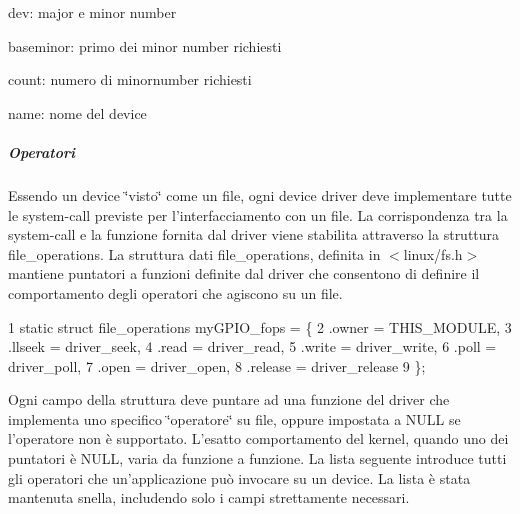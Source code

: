\begin{DoxyItemize}
\item dev\+: major e minor number
\item baseminor\+: primo dei minor number richiesti
\item count\+: numero di minornumber richiesti
\item name\+: nome del device
\end{DoxyItemize}

\subparagraph*{Operatori}

Essendo un device \char`\"{}visto\char`\"{} come un file, ogni device driver deve implementare tutte le system-\/call previste per l'interfacciamento con un file. La corrispondenza tra la system-\/call e la funzione fornita dal driver viene stabilita attraverso la struttura file\+\_\+operations. La struttura dati file\+\_\+operations, definita in $<$linux/fs.\+h$>$ mantiene puntatori a funzioni definite dal driver che consentono di definire il comportamento degli operatori che agiscono su un file. 
\begin{DoxyCode}
1 static struct file\_operations myGPIO\_fops = \{
2     .owner      = THIS\_MODULE,
3     .llseek     = driver\_seek,
4     .read       = driver\_read,
5     .write      = driver\_write,
6     .poll       = driver\_poll,
7     .open       = driver\_open,
8     .release    = driver\_release
9 \};
\end{DoxyCode}
 Ogni campo della struttura deve puntare ad una funzione del driver che implementa uno specifico \char`\"{}operatore\char`\"{} su file, oppure impostata a N\+U\+L\+L se l'operatore non è supportato. L'esatto comportamento del kernel, quando uno dei puntatori è N\+U\+L\+L, varia da funzione a funzione. La lista seguente introduce tutti gli operatori che un'applicazione può invocare su un device. La lista è stata mantenuta snella, includendo solo i campi strettamente necessari.


